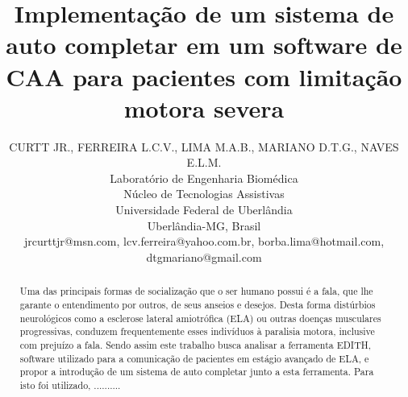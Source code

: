 \documentclass[twoside]{article}
\title{\vspace{-15mm}\fontsize{24pt}{10pt}\selectfont\textbf{Implementação de um sistema de auto completar em um software de CAA para pacientes com limitação motora severa}} %
\author{
\large
\textsc{CURTT JR., FERREIRA L.C.V., LIMA M.A.B., MARIANO D.T.G., NAVES E.L.M.}\\[2mm] %
\normalsize Laboratório de Engenharia Biomédica\\\normalsize Núcleo de Tecnologias Assistivas\\\normalsize Universidade Federal de Uberlândia\\ \normalsize Uberlândia-MG, Brasil \\ %
\normalsize {jrcurttjr@msn.com, lcv.ferreira@yahoo.com.br, borba.lima@hotmail.com, dtgmariano@gmail.com} %
\vspace{-5mm}
}
\date{}
\begin{document}
\maketitle %

\thispagestyle{fancy} %



\begin{abstract}
\noindent
Uma das principais formas de socialização que o ser humano possui é a fala, que lhe garante o entendimento por outros, de seus anseios e desejos. Desta forma distúrbios neurológicos como a esclerose lateral amiotrófica (ELA) ou outras doenças musculares progressivas, conduzem frequentemente esses indivíduos à paralisia motora, inclusive com prejuízo a fala. Sendo assim este trabalho busca analisar a ferramenta EDITH, software utilizado para a comunicação de pacientes em estágio avançado de ELA, e propor a introdução de um sistema de auto completar junto a esta ferramenta. Para isto foi utilizado, .......... 
\end{abstract}

\end{document}
